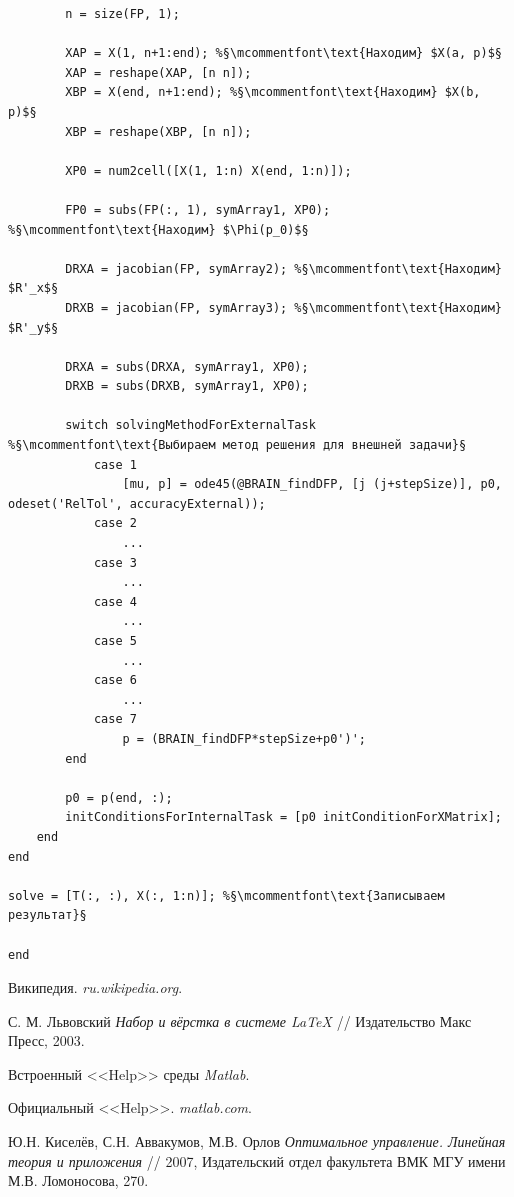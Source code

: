 \documentclass[oneside,final,12pt]{extreport}
\begin{document}
\begin{lstlisting}
		n = size(FP, 1);

		XAP = X(1, n+1:end); %§\mcommentfont\text{Находим} $X(a, p)$§
		XAP = reshape(XAP, [n n]);
		XBP = X(end, n+1:end); %§\mcommentfont\text{Находим} $X(b, p)$§
		XBP = reshape(XBP, [n n]);

		XP0 = num2cell([X(1, 1:n) X(end, 1:n)]);

		FP0 = subs(FP(:, 1), symArray1, XP0); %§\mcommentfont\text{Находим} $\Phi(p_0)$§

		DRXA = jacobian(FP, symArray2); %§\mcommentfont\text{Находим} $R'_x$§
		DRXB = jacobian(FP, symArray3); %§\mcommentfont\text{Находим} $R'_y$§

		DRXA = subs(DRXA, symArray1, XP0);
		DRXB = subs(DRXB, symArray1, XP0);

		switch solvingMethodForExternalTask %§\mcommentfont\text{Выбираем метод решения для внешней задачи}§ 
			case 1
				[mu, p] = ode45(@BRAIN_findDFP, [j (j+stepSize)], p0, odeset('RelTol', accuracyExternal));
			case 2
				...
			case 3
				...
			case 4
				...
			case 5
				...
			case 6
				...
			case 7
				p = (BRAIN_findDFP*stepSize+p0')';
		end
		
		p0 = p(end, :);
		initConditionsForInternalTask = [p0 initConditionForXMatrix];
	end
end

solve = [T(:, :), X(:, 1:n)]; %§\mcommentfont\text{Записываем результат}§

end
\end{lstlisting}


\begin{thebibliography}{0}

Википедия. \emph{ru.wikipedia.org}.

 С. М. Львовский
\emph{Набор и вёрстка в системе \LaTeX{}} // Издательство Макс Пресс, 2003.

Встроенный <<Help>> среды \emph{Matlab}. 

Официальный <<Help>>. \emph{matlab.com}.

\bibitem{}
Ю.Н. Киселёв, С.Н. Аввакумов, М.В. Орлов \emph{Оптимальное управление. Линейная теория и приложения} // 2007, Издательский отдел факультета ВМК МГУ имени М.В. Ломоносова, 270.

\end{thebibliography}
\end{document}
